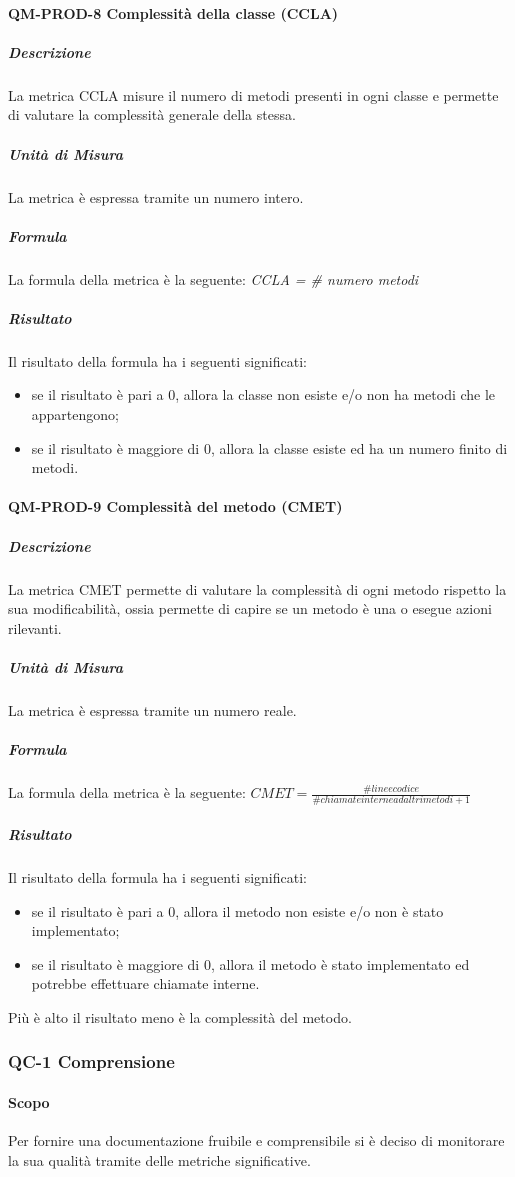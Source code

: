			\paragraph{QM-PROD-8 Complessità della classe (CCLA)}
				\subparagraph{Descrizione}
					La metrica CCLA misure il numero di metodi presenti in ogni classe e permette di valutare la complessità generale della stessa.
				\subparagraph{Unità di Misura}
					La metrica è espressa tramite un numero intero.
				\subparagraph{Formula}
					La formula della metrica è la seguente:
					\textit{CCLA = \# numero metodi}
				\subparagraph{Risultato}
					Il risultato della formula ha i seguenti significati:
					\begin{itemize}
						\item se il risultato è pari a 0, allora la classe non esiste e/o non ha metodi che le appartengono;
						\item se il risultato è maggiore di 0, allora la classe esiste ed ha un numero finito di metodi.
					\end{itemize}
			\paragraph{QM-PROD-9 Complessità del metodo (CMET)}
				\subparagraph{Descrizione}
					La metrica CMET permette di valutare la complessità di ogni metodo rispetto la sua modificabilità, ossia permette di capire se un metodo è una  o esegue azioni rilevanti.
				\subparagraph{Unità di Misura}
					La metrica è espressa tramite un numero reale.
				\subparagraph{Formula}
					La formula della metrica è la seguente:
					\(
						CMET = \frac{\# linee codice}{\# chiamate interne ad altri metodi+1}
					\)
				\subparagraph{Risultato}
					Il risultato della formula ha i seguenti significati:
					\begin{itemize}
						\item se il risultato è pari a 0, allora il metodo non esiste e/o non è stato implementato;
						\item se il risultato è maggiore di 0, allora il metodo è stato implementato ed potrebbe effettuare chiamate interne.
					\end{itemize}
					Più è alto il risultato meno è la complessità del metodo.

		\subsubsection{QC-1 Comprensione}
			\paragraph{Scopo}
				Per fornire una documentazione fruibile e comprensibile si è deciso di monitorare la sua qualità tramite delle metriche significative.
